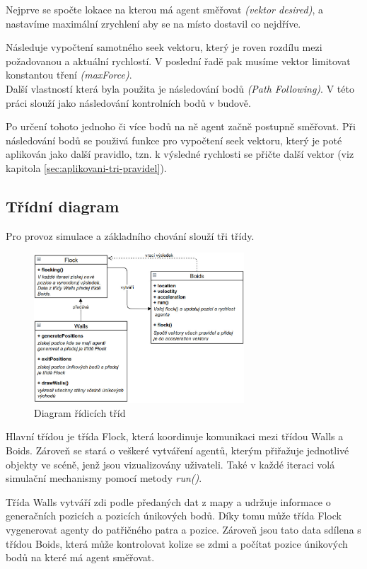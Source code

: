 \documentclass[czech,public,dept460,male,cpdeclaration]{diploma}
\begin{document}
Nejprve se spočte lokace na kterou má agent směřovat \textit{(vektor desired)}, a nastavíme maximální zrychlení aby se na místo dostavil co nejdříve.

Následuje vypočtení samotného seek vektoru, který je roven rozdílu mezi požadovanou a aktuální rychlostí. V poslední řadě pak musíme vektor limitovat konstantou tření \textit{(maxForce)}.
\\

Další vlastností která byla použita je následování bodů \textit{(Path Following)}. V této práci slouží jako následování kontrolních bodů v budově.

Po určení tohoto jednoho či více bodů na ně agent začně postupně směřovat. Při následování bodů se použivá funkce pro vypočtení seek vektoru, který je poté aplikován jako další pravidlo, tzn. k výsledné rychlosti se přičte další vektor (viz kapitola \ref{sec:aplikovani-tri-pravidel}).

\subsection{Třídní diagram}
Pro provoz simulace a základního chování slouží tři třídy.

\begin{figure}[H]\centering\includegraphics[width=0.7\textwidth]{Figures/diagram1.jpg}
	\caption{Diagram řídicích tříd}
\end{figure}

Hlavní třídou je třída Flock, která koordinuje komunikaci mezi třídou Walls a Boids. Zároveň se stará o veškeré vytváření agentů, kterým přiřažuje jednotlivé objekty ve scéně, jenž jsou vizualizovány uživateli. Také v každé iteraci volá simulační mechanismy pomocí metody \textit{run()}.

Třída Walls vytváří zdi podle předaných dat z mapy a udržuje informace o generačních pozicích a pozicích únikových bodů. Díky tomu může třída Flock vygenerovat agenty do patřičného patra a pozice. Zároveň jsou tato data sdílena s třídou Boids, která může kontrolovat kolize se zdmi a počítat pozice únikových bodů na které má agent směřovat.
\end{document}
